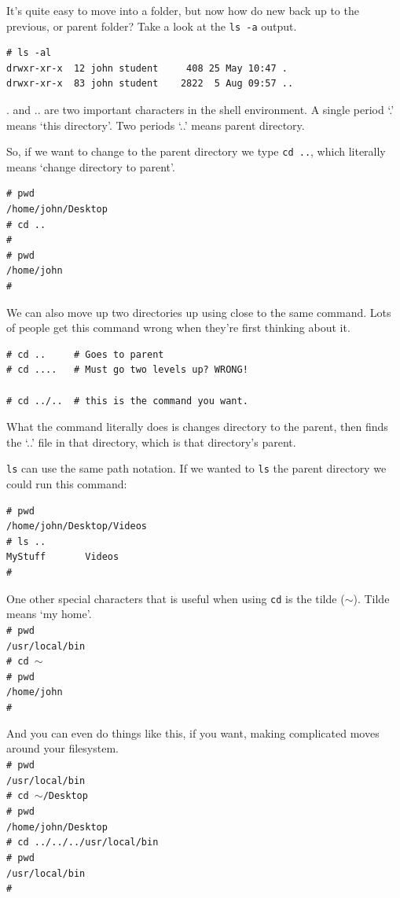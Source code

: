 It's quite easy to move into a folder, but now how do new back up to the 
previous, or parent folder? Take a look at the {\tt ls -a} output. 
{\tt \begin{verbatim}
# ls -al
drwxr-xr-x  12 john student     408 25 May 10:47 .
drwxr-xr-x  83 john student    2822  5 Aug 09:57 ..
\end{verbatim}
}

. and .. are two important characters in the shell environment.  A single period `.' means `this directory'. Two periods `..' means parent directory.

So, if we want to change to the parent directory we type {\tt cd ..}, which literally means `change directory to parent'.
{\tt \begin{verbatim}
# pwd
/home/john/Desktop
# cd ..
#
# pwd
/home/john
#
\end{verbatim}
}

We can also move up two directories up using close to the same command. Lots
 of people get this command wrong when they're first thinking about it.
{\tt \begin{verbatim}
# cd ..     # Goes to parent
# cd ....   # Must go two levels up? WRONG!

# cd ../..  # this is the command you want.
\end{verbatim}
}

What the command literally does is changes directory to the parent, 
then finds the `..' file in that directory, which is that directory's parent.

{\tt ls} can use the same path notation.  If we wanted to {\tt ls} the parent directory we 
could run this command:
{\tt \begin{verbatim}
# pwd
/home/john/Desktop/Videos
# ls ..
MyStuff       Videos        
#
\end{verbatim}
}

One other special characters that is useful when using {\tt cd} is the tilde ($\sim$). Tilde means `my home'.
{\tt \\    %
\# pwd \\
/usr/local/bin \\
\# cd $\sim$ \\
\# pwd \\
/home/john \\
\# \\

}
 
 
And you can even do things like this, if you want, making complicated moves
around your filesystem.
{\tt \\
\# pwd \\
/usr/local/bin \\
\# cd $\sim$/Desktop \\
\# pwd \\
/home/john/Desktop \\
\# cd ../../../usr/local/bin \\
\# pwd \\
/usr/local/bin \\
\# \\ 
}


